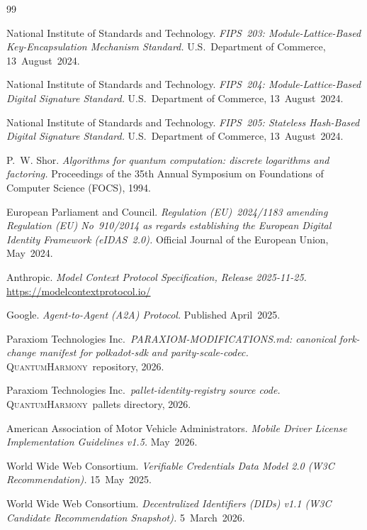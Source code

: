 \documentclass[11pt,a4paper,parskip=half-,DIV=12,headings=standardclasses]{scrartcl}
\theoremstyle{ncthm}
\theoremstyle{ncdef}
\newcommand{\qh}{\textsc{QuantumHarmony}}
\begin{document}
\begin{thebibliography}{99}

 National Institute of Standards and Technology.
\emph{FIPS~203: Module-Lattice-Based Key-Encapsulation Mechanism
Standard.} U.S.\ Department of Commerce, 13~August~2024.

 National Institute of Standards and Technology.
\emph{FIPS~204: Module-Lattice-Based Digital Signature Standard.}
U.S.\ Department of Commerce, 13~August~2024.

 National Institute of Standards and Technology.
\emph{FIPS~205: Stateless Hash-Based Digital Signature Standard.}
U.S.\ Department of Commerce, 13~August~2024.

 P.~W. Shor. \emph{Algorithms for quantum
computation: discrete logarithms and factoring.} Proceedings of the
35th Annual Symposium on Foundations of Computer Science (FOCS),
1994.

 European Parliament and Council. \emph{Regulation
(EU)~2024/1183 amending Regulation (EU) No~910/2014 as regards
establishing the European Digital Identity Framework (eIDAS~2.0).}
Official Journal of the European Union, May~2024.

 Anthropic. \emph{Model Context Protocol
Specification, Release 2025-11-25.} \url{https://modelcontextprotocol.io/}

 Google. \emph{Agent-to-Agent (A2A) Protocol.}
Published April~2025.

 Paraxiom Technologies Inc.\
\emph{PARAXIOM-MODIFICATIONS.md: canonical fork-change manifest for
polkadot-sdk and parity-scale-codec.} \qh\ repository, 2026.

 Paraxiom Technologies Inc.\
\emph{pallet-identity-registry source code.} \qh\ pallets directory,
2026.

 American Association of Motor Vehicle
Administrators. \emph{Mobile Driver License Implementation Guidelines
v1.5.} May~2026.

 World Wide Web Consortium. \emph{Verifiable
Credentials Data Model 2.0 (W3C Recommendation).} 15~May~2025.

 World Wide Web Consortium. \emph{Decentralized
Identifiers (DIDs) v1.1 (W3C Candidate Recommendation Snapshot).}
5~March~2026.


\end{thebibliography}
\end{document}
